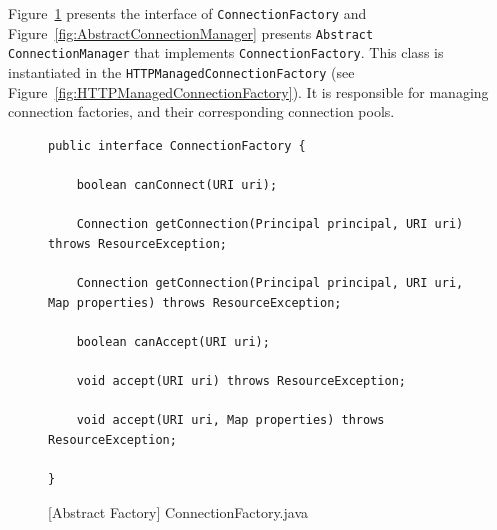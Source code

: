 Figure~\ref{fig:ConnectionFactory} presents the interface of \texttt{ConnectionFactory} and Figure~\ref{fig:AbstractConnectionManager} presents \texttt{Abstract\\ConnectionManager} that implements \texttt{ConnectionFactory}. This class is instantiated in the \texttt{HTTPManagedConnectionFactory} (see Figure~\ref{fig:HTTPManagedConnectionFactory}). It is responsible for managing connection factories, and their corresponding connection pools.

\begin{figure}[htb]
\centering
\lstset{language=Java, basicstyle=\scriptsize, stepnumber=1, showspaces=false, showstringspaces=false,breaklines=true}
\begin{lstlisting}
public interface ConnectionFactory {

    boolean canConnect(URI uri);

    Connection getConnection(Principal principal, URI uri) throws ResourceException;

    Connection getConnection(Principal principal, URI uri, Map properties) throws ResourceException;

    boolean canAccept(URI uri);

    void accept(URI uri) throws ResourceException;

    void accept(URI uri, Map properties) throws ResourceException;

}
\end{lstlisting}
\caption{[Abstract Factory] ConnectionFactory.java}
\label{fig:ConnectionFactory}
\end{figure}
\FloatBarrier

